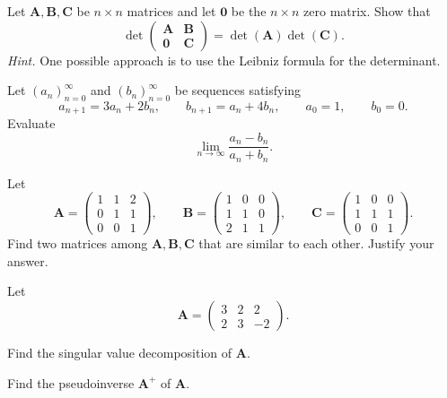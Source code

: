 \documentclass[11pt,oneside]{article}
\begin{document}
\begin{problem}
Let $\mathbf A,\mathbf B,\mathbf C$ be $n\times n$ matrices and let $\mathbf 0$ be the $n\times n$ zero matrix. Show that
\[
\det
\begin{pmatrix}
\mathbf A&\mathbf B\\
\mathbf 0&\mathbf C
\end{pmatrix}
=\det(\mathbf A)\det(\mathbf C).
\]
\textit{Hint.} One possible approach is to use the Leibniz formula for the determinant.
\end{problem}

\begin{problem}
Let $(a_n)_{n=0}^{\infty}$ and $(b_n)_{n=0}^{\infty}$ be sequences satisfying
\[
a_{n+1}=3a_n+2b_n,
\qquad
b_{n+1}=a_n+4b_n,
\qquad
a_0=1,
\qquad
b_0=0.
\]
Evaluate
\[
\lim_{n\to\infty}\frac{a_n-b_n}{a_n+b_n}.
\]
\end{problem}

\begin{problem}
Let
\[
\mathbf A=
\begin{pmatrix}
1&1&2\\
0&1&1\\
0&0&1
\end{pmatrix},
\qquad
\mathbf B=
\begin{pmatrix}
1&0&0\\
1&1&0\\
2&1&1
\end{pmatrix},
\qquad
\mathbf C=
\begin{pmatrix}
1&0&0\\
1&1&1\\
0&0&1
\end{pmatrix}.
\]
Find two matrices among $\mathbf A,\mathbf B,\mathbf C$ that are similar to each other. Justify your answer.
\end{problem}

\begin{problem}
Let
\[
\mathbf A=
\begin{pmatrix}
3&2&2\\
2&3&-2
\end{pmatrix}.
\]
\begin{problemsubparts}
\item Find the singular value decomposition of $\mathbf A$.
\item Find the pseudoinverse $\mathbf A^+$ of $\mathbf A$.
\end{problemsubparts}
\end{problem}
\end{document}

